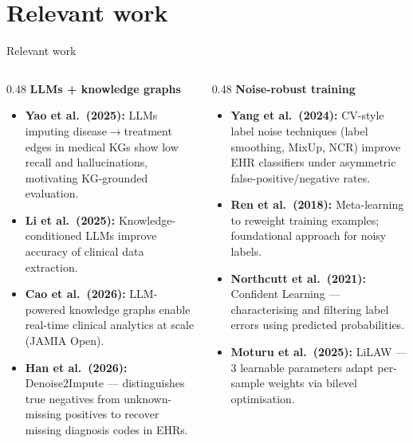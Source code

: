 \documentclass[aspectratio=169]{beamer}
\begin{document}
\section{Relevant work}

\begin{frame}{Relevant work}
  \begin{columns}[T]
    \begin{column}{0.48\textwidth}
      \textbf{LLMs + knowledge graphs}
      \begin{itemize}\footnotesize
        \item \textbf{Yao et al.\ (2025):} LLMs imputing
              disease$\to$treatment edges in medical KGs show
              low recall and hallucinations, motivating
              KG-grounded evaluation.
        \item \textbf{Li et al.\ (2025):} Knowledge-conditioned LLMs
              improve accuracy of clinical data extraction.
        \item \textbf{Cao et al.\ (2026):} LLM-powered knowledge
              graphs enable real-time clinical analytics at scale
              (JAMIA Open).
        \item \textbf{Han et al.\ (2026):} Denoise2Impute ---
              distinguishes true negatives from unknown-missing
              positives to recover missing diagnosis codes in EHRs.
      \end{itemize}
    \end{column}
    \begin{column}{0.48\textwidth}
      \textbf{Noise-robust training}
      \begin{itemize}\footnotesize
        \item \textbf{Yang et al.\ (2024):} CV-style label noise
              techniques (label smoothing, MixUp, NCR) improve EHR
              classifiers under asymmetric false-positive/negative rates.
        \item \textbf{Ren et al.\ (2018):} Meta-learning to reweight
              training examples; foundational approach for noisy labels.
        \item \textbf{Northcutt et al.\ (2021):} Confident Learning ---
              characterising and filtering label errors using predicted
              probabilities.
        \item \textbf{Moturu et al.\ (2025):} LiLAW --- 3 learnable
              parameters adapt per-sample weights via bilevel optimisation.
      \end{itemize}
    \end{column}
  \end{columns}
\end{frame}
\end{document}
